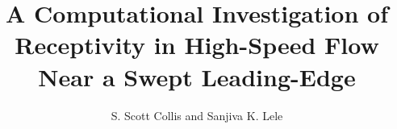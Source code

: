 %
%
%
%
%
  \title{A Computational Investigation of \\ 
         Receptivity in High-Speed Flow \\
         Near a Swept Leading-Edge}
  \author{S. Scott Collis and Sanjiva K. Lele}
  \copyrightfalse
\trbeforepreface
    
    
  \figurespagetrue
  \tablespagetrue
\trafterpreface
